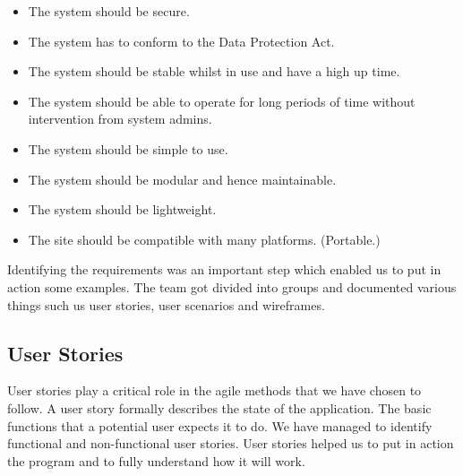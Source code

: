 \documentclass{l3proj}
\begin{document}
\begin{itemize}

\item The system should be secure.

\item The system has to conform to the Data Protection Act.

\item The system should be stable whilst in use and have a high up time.

\item The system should be able to operate for long periods of time without intervention from system admins.

\item The system should be simple to use.

\item The system should be modular and hence maintainable.

\item The system should be lightweight.

\item The site should be compatible with many platforms. (Portable.)

\end{itemize}

Identifying the requirements was an important step which enabled us to put in action some examples. The team got divided into groups and documented various things such us user stories, user scenarios and wireframes. 

\subsection{User Stories}
\label{user_stories}

User stories play a critical role in the agile methods that we have chosen to follow. A user story formally describes the state of the application. The basic functions that a potential user expects it to do. We have managed to identify functional and non-functional user stories. User stories helped us to put in action the program and to fully understand how it will work.
\end{document}
